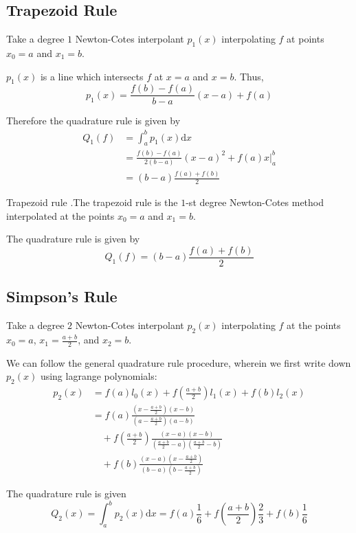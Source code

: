 \documentclass[12pt,letterpaper]{article}
\newcommand{\dd}{\mathrm{d}}
\begin{document}
\subsection{Trapezoid Rule}
Take a degree $1$ Newton-Cotes interpolant $p_1(x)$ interpolating $f$ at points $x_0 = a$ and $x_1 = b$.

$p_1(x)$ is a line which intersects $f$ at $x=a$ and $x=b$. Thus,
\begin{equation}
	p_1(x) = \frac{f(b) - f(a)}{b-a}(x - a) + f(a)
\end{equation}

Therefore the quadrature rule is given by
\begin{align}
	Q_1(f) &= \int_a^b p_1(x) \dd x \\
	&= \frac{f(b) - f(a)}{2(b-a)}(x-a)^2 + f(a)x \bigg|_a^b \\
	&= (b-a) \frac{f(a) + f(b)}{2}
\end{align}

\begin{defn}{Trapezoid rule}
.The trapezoid rule is the $1$-st degree Newton-Cotes method interpolated at the points $x_0 = a$ and $x_1 = b$.

\medskip

The quadrature rule is given by
\begin{equation}
	Q_1(f) = (b-a) \frac{f(a) + f(b)}{2}
\end{equation}
\label{defn:trap_rule}
\end{defn}

\subsection{Simpson's Rule}
Take a degree $2$ Newton-Cotes interpolant $p_2(x)$ interpolating $f$ at the points $x_0 = a$, $x_1 = \frac{a+b}{2}$, and $x_2 = b$.

We can follow the general quadrature rule procedure, wherein we first write down $p_2(x)$ using lagrange polynomials:
\begin{align}
	p_2(x) &= f(a) l_0(x) + f(\frac{a+b}{2}) l_1(x) + f(b) l_2(x) \\
	&= f(a) \frac{(x-\frac{a+b}{2})(x-b)}{(a-\frac{a+b}{2})(a-b)} \\
	&\quad + f(\frac{a+b}{2})\frac{(x-a)(x-b)}{(\frac{a+b}{2}-a)(\frac{a+b}{2}-b)} \\
	&\quad + f(b) \frac{(x-a)(x-\frac{a+b}{2})}{(b-a)(b-\frac{a+b}{2})}
\end{align}

The quadrature rule is given
\begin{equation}
	Q_2(x) = \int_a^b p_2(x) \dd x = f(a) \frac{1}{6} + f\left(\frac{a+b}{2}\right) \frac{2}{3} + f(b) \frac{1}{6}
\end{equation}
\end{document}
